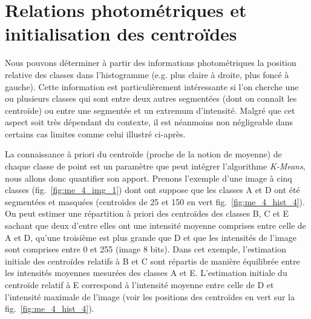 	

		\section{Relations photométriques et initialisation des centroïdes}
		Nous pouvons déterminer à partir des informations photométriques la position relative des classes dans l'histogramme (e.g. plus claire à droite, plus foncé à gauche). Cette information est particulièrement intéressante si l'on cherche une ou plusieurs classes qui sont entre deux autres segmentées (dont on connaît les centroïde) ou entre une segmentée et un extremum d'intensité. Malgré que cet aspect soit très dépendant du contexte, il est néanmoins non négligeable dans certains cas limites comme celui illustré ci-après. %

	La connaissance à priori du centroïde (proche de la notion de moyenne) de chaque classe de point est un paramètre que peut intégrer l'algorithme \emph{K-Means}, nous allons donc quantifier son apport. Prenons l'exemple d'une image à cinq classes (fig.~\ref{fig:me_4_img_1}) dont ont suppose que les classes A et D ont été segmentées et masquées (centroïdes de 25 et 150 en vert fig.~\ref{fig:me_4_hist_4}). On peut estimer une répartition à priori des centroïdes des classes B, C et E sachant que deux d'entre elles ont une intensité moyenne comprises entre celle de A et D, qu'une troisième est plus grande que D et que les intensités de l'image sont comprises entre 0 et 255 (image 8 bits). Dans cet exemple, l'estimation initiale des centroïdes relatifs à B et C sont répartis de manière équilibrée entre les intensités moyennes mesurées des classes A et E. L'estimation initiale du centroïde relatif à E correspond à l'intensité moyenne entre celle de D et l'intensité maximale de l'image (voir les positions des centroïdes en vert sur la fig.~\ref{fig:me_4_hist_4}). %


